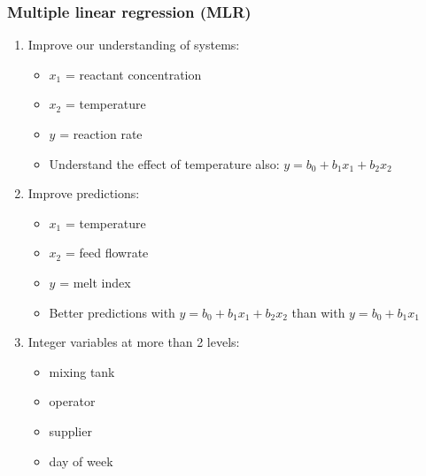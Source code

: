 \begin{frame}\frametitle{Multiple linear regression (MLR)}
	\begin{enumerate}
		\item	Improve our understanding of systems: 
		\begin{itemize}
			\item	$x_1$ = reactant concentration 
			\item	$x_2$ = temperature 
			\item	$y$ = reaction rate 
			\item	Understand the effect of temperature also: $y = b_0 + b_1x_1 + b_2x_2$ 
		\end{itemize}
		\item	Improve predictions: 
		\begin{itemize}
			\item	$x_1$ = temperature 
			\item	$x_2$ = feed flowrate 
			\item	$y$ = melt index 
			\item	Better predictions with $y = b_0 + b_1x_1 + b_2x_2$ than with $y = b_0 + b_1x_1$ 
		\end{itemize}
		\item	Integer variables at more than 2 levels: 
		\begin{itemize}
			\item	mixing tank 
			\item	operator 
			\item	supplier 
			\item	day of week 
		\end{itemize}
	\end{enumerate}
\end{frame}

